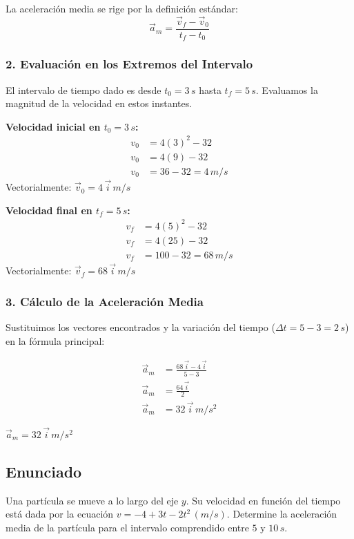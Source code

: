 \documentclass[12pt, a4paper]{article}
\begin{document}
La aceleración media se rige por la definición estándar:
$$ \vec{a}_m = \frac{\vec{v}_f - \vec{v}_0}{t_f - t_0} $$

\subsubsection*{2. Evaluación en los Extremos del Intervalo}
El intervalo de tiempo dado es desde $t_0 = 3 \, \si{s}$ hasta $t_f = 5 \, \si{s}$. Evaluamos la magnitud de la velocidad en estos instantes.

\textbf{Velocidad inicial en $t_0 = 3 \, \si{s}$:}
\begin{align*}
    v_0 &= 4(3)^2 - 32 \\
    v_0 &= 4(9) - 32 \\
    v_0 &= 36 - 32 = 4 \, \si{m/s}
\end{align*}
Vectorialmente: $\vec{v}_0 = 4 \, \vec{i} \, \si{m/s}$

\textbf{Velocidad final en $t_f = 5 \, \si{s}$:}
\begin{align*}
    v_f &= 4(5)^2 - 32 \\
    v_f &= 4(25) - 32 \\
    v_f &= 100 - 32 = 68 \, \si{m/s}
\end{align*}
Vectorialmente: $\vec{v}_f = 68 \, \vec{i} \, \si{m/s}$

\subsubsection*{3. Cálculo de la Aceleración Media}
Sustituimos los vectores encontrados y la variación del tiempo ($\Delta t = 5 - 3 = 2 \, \si{s}$) en la fórmula principal:

\begin{align*}
    \vec{a}_m &= \frac{68 \, \vec{i} - 4 \, \vec{i}}{5 - 3} \\
    \vec{a}_m &= \frac{64 \, \vec{i}}{2} \\
    \vec{a}_m &= 32 \, \vec{i} \, \si{m/s^2}
\end{align*}

\begin{tcolorbox}[colback=green!5!white, colframe=green!50!black, title=Respuesta Final]
\centering \Large $\vec{a}_m = 32 \, \vec{i} \, \si{m/s^2}$
\end{tcolorbox}

\newpage

\subsection*{Enunciado}
Una partícula se mueve a lo largo del eje $y$. Su velocidad en función del tiempo está dada por la ecuación $v = -4 + 3t - 2t^2 \, (\si{m/s})$. Determine la aceleración media de la partícula para el intervalo comprendido entre $5$ y $10 \, \si{s}$.
\end{document}
